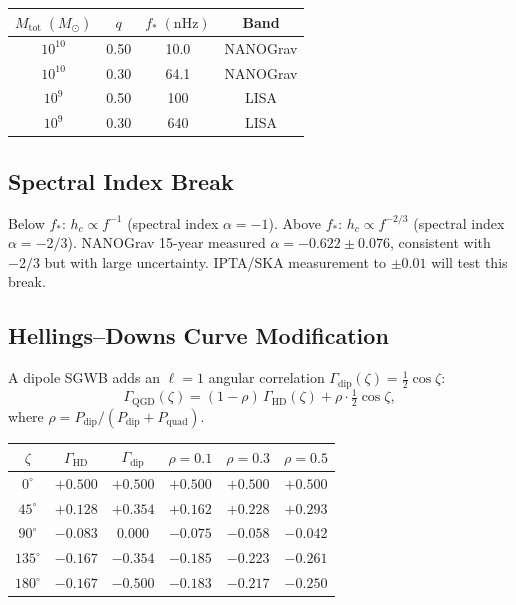 \documentclass[12pt,a4paper]{article}
\newcommand{\Msun}{M_{\odot}}
\begin{document}
\begin{center}
\renewcommand{\arraystretch}{1.15}
\begin{tabular}{cccc}
\toprule
$M_{\mathrm{tot}}\;(\Msun)$ & $q$ & $f_*\;(\mathrm{nHz})$ & Band\\
\midrule
$10^{10}$ & 0.50 & 10.0 & NANOGrav\\
$10^{10}$ & 0.30 & 64.1 & NANOGrav\\
$10^9$    & 0.50 & 100  & LISA\\
$10^9$    & 0.30 & 640  & LISA\\
\bottomrule
\end{tabular}
\end{center}

\subsection{Spectral Index Break}

\begin{prediction}
Below $f_*$: $h_c\propto f^{-1}$ (spectral index $\alpha=-1$).
Above $f_*$: $h_c\propto f^{-2/3}$ (spectral index $\alpha=-2/3$).
NANOGrav 15-year measured $\alpha=-0.622\pm0.076$, consistent with
$-2/3$ but with large uncertainty.
IPTA/SKA measurement to $\pm0.01$ will test this break.
\end{prediction}

\subsection{Hellings--Downs Curve Modification}

A dipole SGWB adds an $\ell=1$ angular correlation
$\Gamma_{\mathrm{dip}}(\zeta)=\frac{1}{2}\cos\zeta$:
\begin{equation}
  \Gamma_{\mathrm{QGD}}(\zeta)
  = (1-\rho)\,\Gamma_{\mathrm{HD}}(\zeta) + \rho\cdot\tfrac{1}{2}\cos\zeta,
\end{equation}
where $\rho=P_{\mathrm{dip}}/(P_{\mathrm{dip}}+P_{\mathrm{quad}})$.

\begin{center}
\renewcommand{\arraystretch}{1.15}
\begin{tabular}{cccccc}
\toprule
$\zeta$ & $\Gamma_{\mathrm{HD}}$ & $\Gamma_{\mathrm{dip}}$
        & $\rho=0.1$ & $\rho=0.3$ & $\rho=0.5$\\
\midrule
$0^{\circ}$   & $+0.500$ & $+0.500$ & $+0.500$ & $+0.500$ & $+0.500$\\
$45^{\circ}$  & $+0.128$ & $+0.354$ & $+0.162$ & $+0.228$ & $+0.293$\\
$90^{\circ}$  & $-0.083$ &  $0.000$ & $-0.075$ & $-0.058$ & $-0.042$\\
$135^{\circ}$ & $-0.167$ & $-0.354$ & $-0.185$ & $-0.223$ & $-0.261$\\
$180^{\circ}$ & $-0.167$ & $-0.500$ & $-0.183$ & $-0.217$ & $-0.250$\\
\bottomrule
\end{tabular}
\end{center}
\end{document}
